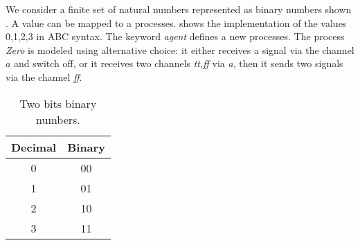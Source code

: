 We consider a finite set of natural numbers represented as binary numbers shown . A value can be mapped to a \picalc{} processes.  shows the \picalc{} implementation of the values 0,1,2,3 in ABC syntax. The keyword \textit{agent} defines a new processes. The process \textit{Zero} is modeled using alternative choice: it either receives a signal via the channel $a$ and switch off, or it receives two channels \textit{tt,ff} via \textit{a}, then it sends two signals via the channel \textit{ff}.
\begin{table}[H]
\centering
\begin{tabular}{|c|c|}
\hline
Decimal & Binary \\ \hline
0       & 00     \\ \hline
1       & 01     \\ \hline
2       & 10     \\ \hline
3       & 11     \\ \hline
\end{tabular}%
\caption{Two bits binary numbers.}
\label{two_bit_binary_numbers}
\end{table}

